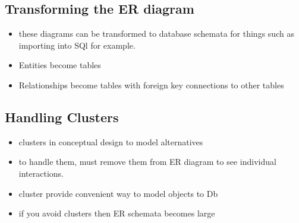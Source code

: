 \documentclass{article}
\begin{document}
	\subsection{Transforming the ER diagram}
		\begin{itemize}
			\item these diagrams can be transformed to database schemata for things such as importing into SQl for example.
			\item Entities become tables
			\item Relationships become tables with foreign key connections to other tables
		\end{itemize}

	\subsection{Handling Clusters}
		\begin{itemize}
			\item clusters in conceptual design to model alternatives
			\item to handle them, must remove them from ER diagram to see individual interactions.
			\item cluster provide convenient way to model objects to Db
			\item if you avoid clusters then ER schemata becomes large
		\end{itemize}
\end{document}
